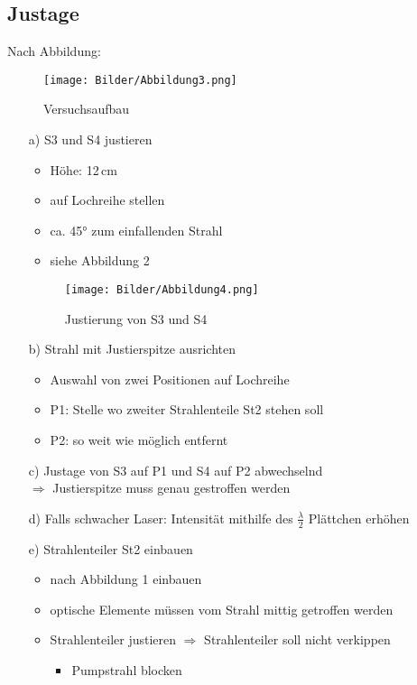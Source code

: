 \documentclass[a4paper, twoside]{article}
\begin{document}
\subsection{Justage}
Nach Abbildung:
\begin{figure}[h]
    \centering
    \texttt{[image: Bilder/Abbildung3.png]}
    \caption{Versuchsaufbau}
   \end{figure}
\newpage
\begin{itemize}
    \item[a)] S3 und S4 justieren
    \begin{itemize}
        \item Höhe: 12\,cm
        \item auf Lochreihe stellen
        \item ca. 45° zum einfallenden Strahl
        \item siehe Abbildung 2
    \end{itemize} 
    \begin{figure}[h]
        \centering
        \texttt{[image: Bilder/Abbildung4.png]}
        \caption{Justierung von S3 und S4}
       \end{figure}
    \item[b)] Strahl mit Justierspitze ausrichten
    \begin{itemize}
        \item Auswahl von zwei Positionen auf Lochreihe
        \item P1: Stelle wo zweiter Strahlenteile St2 stehen soll
        \item P2: so weit wie möglich entfernt
    \end{itemize} 
    \item[c)] Justage von S3 auf P1 und S4 auf P2 abwechselnd \\
    $\Rightarrow$ Justierspitze muss genau gestroffen werden
    \item[d)] Falls schwacher Laser: Intensität mithilfe des $\frac{\lambda}{2}$ Plättchen erhöhen 
    \item[e)] Strahlenteiler St2 einbauen
    \begin{itemize}
        \item nach Abbildung 1 einbauen
        \item optische Elemente müssen vom Strahl mittig getroffen werden 
        \item Strahlenteiler justieren $\Rightarrow$ Strahlenteiler soll nicht verkippen
        \begin{itemize}
            \item Pumpstrahl blocken

\end{itemize}
\end{itemize}
\end{itemize}
\end{document}
